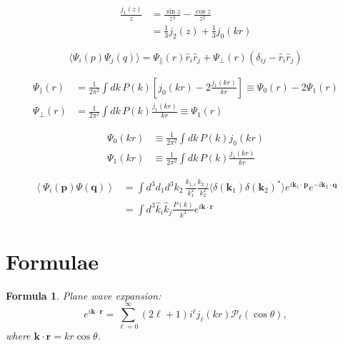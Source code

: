 \documentclass[a4paper,11pt]{article}
\newtheorem{formula}{Formula}[section]
\begin{document}
\begin{equation}
  \begin{split}
    \frac{j_1(z)}{z} &= \frac{\sin z}{z^3} - \frac{\cos z}{z^2} \\
    &= \frac{1}{3} j_2(z) + \frac{1}{3} j_0(kr)
  \end{split}
\end{equation}

\begin{equation}
  \langle \Psi_i(p) \Psi_j(q) \rangle
  = \Psi_\parallel(r) \hat{r}_i \hat{r}_j
  + \Psi_\perp(r) (\delta_{ij} - \hat{r}_i \hat{r}_j)
\end{equation}

\begin{align}
  \Psi_\parallel(r) &= \frac{1}{2\pi^2} \int \! dk \, P(k)
  \left[j_0(kr) - 2 \frac{j_1(kr)}{kr} \right] \equiv \Psi_0(r) - 2 \Psi_1(r)\\
  \Psi_\perp(r) &= \frac{1}{2\pi^2} \int \! dk \, P(k)
  \frac{j_1(kr)}{kr} \equiv \Psi_1(r)
\end{align}

\begin{align}
  \Psi_0(kr) &\equiv \frac{1}{2\pi^2} \int \! dk \, P(k) j_0(kr) \\
  \Psi_1(kr) &\equiv \frac{1}{2\pi^2} \int \! dk \, P(k) \frac{j_1(kr)}{kr}
\end{align}

\begin{align}
  \left\langle \Psi_i(\bm{p}) \Psi(\bm{q}) \right\rangle
  &= \int d^3 d_1 d^3 k_2 \, \frac{k_{1, i}}{k_1^2} \frac{k_{2,j}}{k_2^2}
     \langle \delta(\bm{k}_1) \delta(\bm{k}_2)^* \rangle e^{i\bm{k}_1 \cdot \bm{p}}
     e^{-i\bm{k}_2 \cdot \bm{q}}\\
  &= \int \! d^3 \hat{k}_i \hat{k}_j \frac{P(k)}{k^2} e^{i\bm{k}\cdot \bm{r}} 
\end{align}

\appendix

\section{Formulae}

\begin{formula}
  Plane wave expansion:
  \begin{equation}
    e^{i\bm{k} \cdot \bm{r}} = \sum_{\ell=0}^\infty (2 \ell + 1) i^\ell j_\ell(kr) \mathcal{P}_\ell (\cos \theta),
  \end{equation}
where $\bm{k} \cdot \bm{r} = k r \cos\theta$.
\end{formula}
\end{document}
